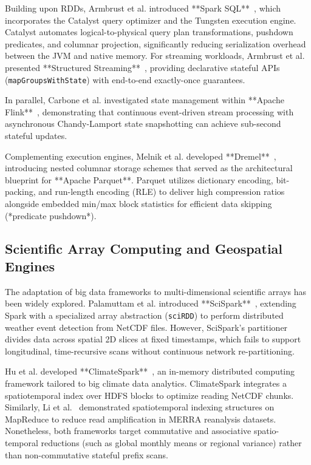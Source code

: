 \documentclass[10pt,conference]{IEEEtran}
\begin{document}
Building upon RDDs, Armbrust et al. introduced **Spark SQL**~\cite{armbrust2015sparksql}, which incorporates the Catalyst query optimizer and the Tungsten execution engine. Catalyst automates logical-to-physical query plan transformations, pushdown predicates, and columnar projection, significantly reducing serialization overhead between the JVM and native memory. For streaming workloads, Armbrust et al. presented **Structured Streaming**~\cite{armbrust2018structured}, providing declarative stateful APIs (\texttt{mapGroupsWithState}) with end-to-end exactly-once guarantees. 

In parallel, Carbone et al. investigated state management within **Apache Flink**~\cite{carbone2017state}, demonstrating that continuous event-driven stream processing with asynchronous Chandy-Lamport state snapshotting can achieve sub-second stateful updates. 

Complementing execution engines, Melnik et al. developed **Dremel**~\cite{melnik2010dremel}, introducing nested columnar storage schemes that served as the architectural blueprint for **Apache Parquet**. Parquet utilizes dictionary encoding, bit-packing, and run-length encoding (RLE) to deliver high compression ratios alongside embedded min/max block statistics for efficient data skipping (*predicate pushdown*).

\subsection{Scientific Array Computing and Geospatial Engines}
The adaptation of big data frameworks to multi-dimensional scientific arrays has been widely explored. Palamuttam et al. introduced **SciSpark**~\cite{palamuttam2015scispark}, extending Spark with a specialized array abstraction (\texttt{sciRDD}) to perform distributed weather event detection from NetCDF files. However, SciSpark's partitioner divides data across spatial 2D slices at fixed timestamps, which fails to support longitudinal, time-recursive scans without continuous network re-partitioning. 

Hu et al. developed **ClimateSpark**~\cite{hu2018climatespark}, an in-memory distributed computing framework tailored to big climate data analytics. ClimateSpark integrates a spatiotemporal index over HDFS blocks to optimize reading NetCDF chunks. Similarly, Li et al.~\cite{li2016spatiotemporal} demonstrated spatiotemporal indexing structures on MapReduce to reduce read amplification in MERRA reanalysis datasets. Nonetheless, both frameworks target commutative and associative spatio-temporal reductions (such as global monthly means or regional variance) rather than non-commutative stateful prefix scans.
\end{document}
